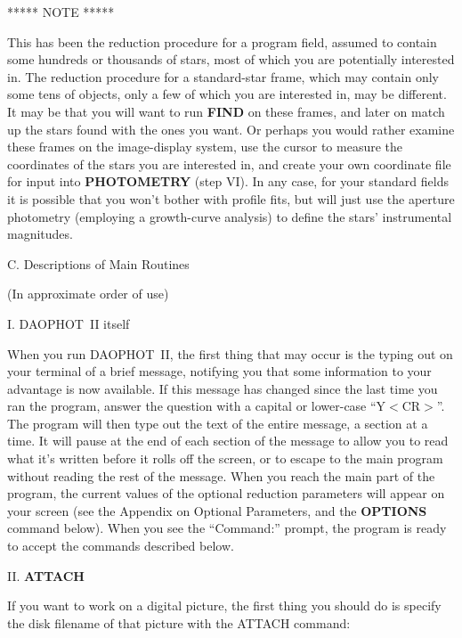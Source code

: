 \bigskip
\medskip
\centerline{***** NOTE *****}

This has been the reduction procedure for a program field, assumed
to contain some hundreds or thousands of stars, most of which you are
potentially interested in.  The reduction procedure for a standard-star
frame, which may contain only some tens of objects, only a few of which
you are interested in, may be different.  It may be that you will want
to run {\bf FIND} on these frames, and later on match up the stars
found with the ones you want.  Or perhaps you would rather examine
these frames on the image-display system, use the cursor to measure the
coordinates of the stars you are interested in, and create your own
coordinate file for input into {\bf PHOTOMETRY} (step VI).  In any
case, for your standard fields it is possible that you won't bother
with profile fits, but will just use the aperture photometry (employing
a growth-curve analysis) to define the stars' instrumental magnitudes.

\vfill
\eject
\centerline{C.  Descriptions of Main Routines}
\centerline{(In approximate order of use)}
\noindent I.  DAOPHOT~II itself

When you run DAOPHOT~II, the first thing that may occur is the typing
out on your terminal of a brief message, notifying you that some
information to your advantage is now available.  If this message has
changed since the last time you ran the program, answer the question
with a capital or lower-case ``Y$<$CR$>$''.  The program will then type
out the text of the entire message, a section at a time.  It will pause
at the end of each section of the message to allow you to read what
it's written before it rolls off the screen, or to escape to the main
program without reading the rest of the message.  When you reach the
main part of the program, the current values of the optional reduction
parameters will appear on your screen (see the Appendix on Optional
Parameters, and the {\bf OPTIONS} command below).  When you see the
``Command:'' prompt, the program is ready to accept the commands
described below.

\vfill
\eject
\noindent II.  {\bf ATTACH}

     If you want to work on a digital picture, the first thing you
should do is specify the disk filename of that picture with the ATTACH
command:

